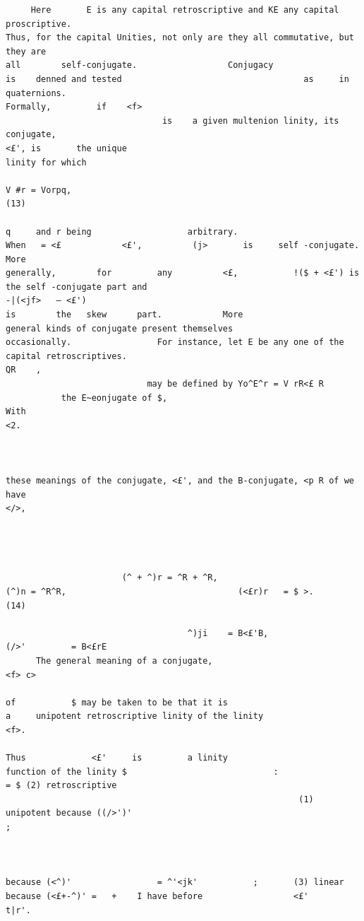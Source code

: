 \documentclass[10pt]{article}
\begin{document}
\begin{verbatim}
     Here       E is any capital retroscriptive and KE any capital proscriptive.
Thus, for the capital Unities, not only are they all commutative, but they are
all        self-conjugate.                  Conjugacy                    is    denned and tested                                    as     in         quaternions.
Formally,         if    <f>
                               is    a given multenion linity, its conjugate,                                                             <£', is       the unique
linity for which
                                                                       V #r = Vorpq,                                                                                    (13)

q     and r being                   arbitrary.                         When   = <£            <£',          (j>       is     self -conjugate.                          More
generally,        for         any          <£,           !($ + <£') is          the self -conjugate part and                                                 -|(<jf>   — <£')
is        the   skew      part.            More                   general kinds of conjugate present themselves
occasionally.                 For instance, let E be any one of the capital retroscriptives.
QR    ,
                            may be defined by Yo^E^r = V rR<£ R
           the E~eonjugate of $,                                        With                                                                                 <2.



these meanings of the conjugate, <£', and the B-conjugate, <p R of we have                                                                       </>,




                       (^ + ^)r = ^R + ^R,                                   (^)n = ^R^R,                                  (<£r)r   = $ >.                              (14)

                                    ^)ji    = B<£'B,                             (/>'         = B<£rE
      The general meaning of a conjugate,                                            <f> c>
                                                                                              of           $ may be taken to be that it is
a     unipotent retroscriptive linity of the linity                                                                   <f>.
                                                                                                                               Thus             <£'     is         a linity
function of the linity $                             :                                = $ (2) retroscriptive
                                                          (1) unipotent because ((/>')'                                             ;



because (<^)'                 = ^'<jk'           ;       (3) linear because (<£+-^)' =   +    I have before                  <£'        t|r'.


\end{verbatim}
\end{document}

